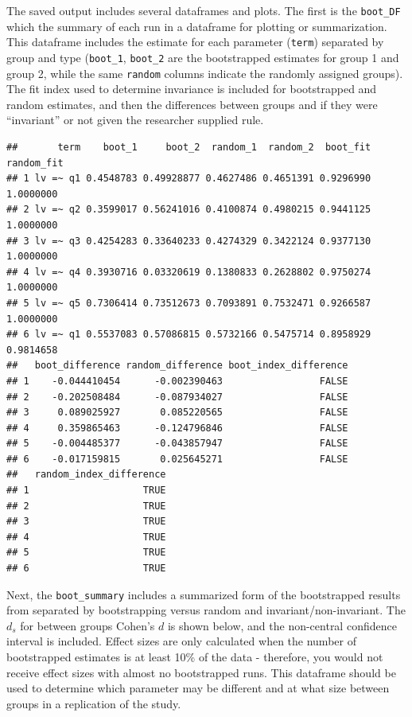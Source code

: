 \documentclass[
  man]{apa7}
\newenvironment{Shaded}{\begin{snugshade}}{\end{snugshade}}
\newcommand{\FunctionTok}[1]{\textcolor[rgb]{0.13,0.29,0.53}{\textbf{#1}}}
\newcommand{\NormalTok}[1]{#1}
\newcommand{\SpecialCharTok}[1]{\textcolor[rgb]{0.81,0.36,0.00}{\textbf{#1}}}
\begin{document}
The saved output includes several dataframes and plots. The first is the \texttt{boot\_DF} which the summary of each run in a dataframe for plotting or summarization. This dataframe includes the estimate for each parameter (\texttt{term}) separated by group and type (\texttt{boot\_1}, \texttt{boot\_2} are the bootstrapped estimates for group 1 and group 2, while the same \texttt{random} columns indicate the randomly assigned groups). The fit index used to determine invariance is included for bootstrapped and random estimates, and then the differences between groups and if they were ``invariant'' or not given the researcher supplied rule.

\small

\begin{Shaded}
\end{Shaded}

\normalsize

\begin{verbatim}
##       term    boot_1     boot_2  random_1  random_2  boot_fit random_fit
## 1 lv =~ q1 0.4548783 0.49928877 0.4627486 0.4651391 0.9296990  1.0000000
## 2 lv =~ q2 0.3599017 0.56241016 0.4100874 0.4980215 0.9441125  1.0000000
## 3 lv =~ q3 0.4254283 0.33640233 0.4274329 0.3422124 0.9377130  1.0000000
## 4 lv =~ q4 0.3930716 0.03320619 0.1380833 0.2628802 0.9750274  1.0000000
## 5 lv =~ q5 0.7306414 0.73512673 0.7093891 0.7532471 0.9266587  1.0000000
## 6 lv =~ q1 0.5537083 0.57086815 0.5732166 0.5475714 0.8958929  0.9814658
##   boot_difference random_difference boot_index_difference
## 1    -0.044410454      -0.002390463                 FALSE
## 2    -0.202508484      -0.087934027                 FALSE
## 3     0.089025927       0.085220565                 FALSE
## 4     0.359865463      -0.124796846                 FALSE
## 5    -0.004485377      -0.043857947                 FALSE
## 6    -0.017159815       0.025645271                 FALSE
##   random_index_difference
## 1                    TRUE
## 2                    TRUE
## 3                    TRUE
## 4                    TRUE
## 5                    TRUE
## 6                    TRUE
\end{verbatim}

Next, the \texttt{boot\_summary} includes a summarized form of the bootstrapped results from separated by bootstrapping versus random and invariant/non-invariant. The \(d_s\) for between groups Cohen's \(d\) is shown below, and the non-central confidence interval is included. Effect sizes are only calculated when the number of bootstrapped estimates is at least 10\% of the data - therefore, you would not receive effect sizes with almost no bootstrapped runs. This dataframe should be used to determine which parameter may be different and at what size between groups in a replication of the study.
\end{document}
